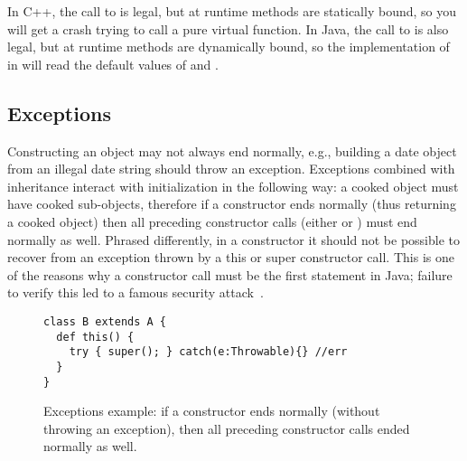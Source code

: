 In C++, the call to  is legal,
    but at runtime
    methods are statically bound,
    so you will get a crash trying to call a pure virtual function.
In Java, the call to  is also legal,
    but at runtime
    methods are dynamically bound,
    so the implementation of  in 
    will read the default values of  and .




\subsection{Exceptions}
Constructing an object may not always end normally,
    e.g., building a date object from an illegal date string should throw an exception.
Exceptions combined with inheritance interact with initialization in the following way:
    a cooked object must have cooked sub-objects,
    therefore if a constructor ends normally (thus returning a cooked object)
    then all preceding constructor calls (either  or )
    must end normally as well.
Phrased differently, in a constructor it should not be possible to
    recover from an exception thrown by a this or super constructor call.
This is one of the reasons why a constructor call must be the first statement in Java;
    failure to verify this led to a famous security attack~\cite{Dean:1996}.

\begin{figure}
\vspace{-0.2cm}\begin{lstlisting}
class B extends A {
  def this() {
    try { super(); } catch(e:Throwable){} //err
  }
}
\end{lstlisting}\vspace{-0.2cm}
\caption{Exceptions example:
    if a constructor ends normally (without throwing an exception),
        then all preceding constructor calls ended normally as well.
    }
\label{Figure:Exceptions}
\end{figure}


